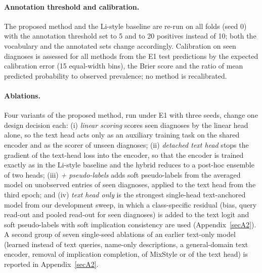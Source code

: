 \paragraph{Annotation threshold and calibration.}
The proposed method and the Li-style baseline are re-run on all folds (seed 0) with the annotation threshold set to 5 and to 20 positives instead of 10; both the vocabulary and the annotated sets change accordingly. Calibration on seen diagnoses is assessed for all methods from the E1 test predictions by the expected calibration error (15 equal-width bins), the Brier score and the ratio of mean predicted probability to observed prevalence; no method is recalibrated.

\paragraph{Ablations.}
Four variants of the proposed method, run under E1 with three seeds, change one design decision each: (i) \emph{linear scoring} scores seen diagnoses by the linear head alone, so the text head acts only as an auxiliary training task on the shared encoder and as the scorer of unseen diagnoses; (ii) \emph{detached text head} stops the gradient of the text-head loss into the encoder, so that the encoder is trained exactly as in the Li-style baseline and the hybrid reduces to a post-hoc ensemble of two heads; (iii) \emph{+ pseudo-labels} adds soft pseudo-labels from the averaged model on unobserved entries of seen diagnoses, applied to the text head from the third epoch; and (iv) \emph{text head only} is the strongest single-head text-anchored model from our development sweep, in which a class-specific residual (bias, query read-out and pooled read-out for seen diagnoses) is added to the text logit and soft pseudo-labels with soft implication consistency are used (Appendix~\ref{secA2}). A second group of seven single-seed ablations of an earlier text-only model (learned instead of text queries, name-only descriptions, a general-domain text encoder, removal of implication completion, of MixStyle or of the text head) is reported in Appendix~\ref{secA2}.

